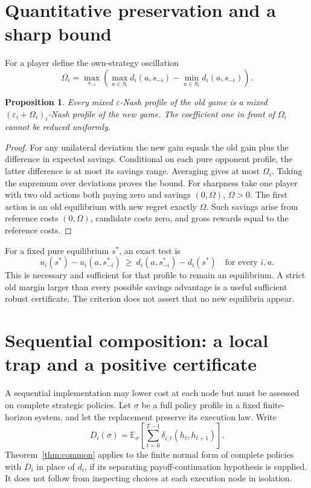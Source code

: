 \documentclass[11pt]{article}
\newtheorem{proposition}[theorem]{Proposition}
\begin{document}
\section{Quantitative preservation and a sharp bound}
For a player define the own-strategy oscillation
\[
 \Omega_i=\max_{s_{-i}}\left(\max_{a\in S_i}d_i(a,s_{-i})-
                                      \min_{a\in S_i}d_i(a,s_{-i})\right).
\]
\begin{proposition}\label{prop:regret}
Every mixed \(\varepsilon\)-Nash profile of the old game is a mixed
\((\varepsilon_i+\Omega_i)_i\)-Nash profile of the new game. The coefficient one in front of \(\Omega_i\) cannot be reduced uniformly.
\end{proposition}
\begin{proof}
For any unilateral deviation the new gain equals the old gain plus the difference in expected savings. Conditional on each pure opponent profile, the latter difference is at most its savings range. Averaging gives at most \(\Omega_i\). Taking the supremum over deviations proves the bound. For sharpness take one player with two old actions both paying zero and savings \((0,\Omega)\), \(\Omega>0\). The first action is an old equilibrium with new regret exactly \(\Omega\). Such savings arise from reference costs \((0,\Omega)\), candidate costs zero, and gross rewards equal to the reference costs.
\end{proof}
For a fixed pure equilibrium \(s^*\), an exact test is
\[
 u_i(s^*)-u_i(a,s^*_{-i})\ \geq\
 d_i(a,s^*_{-i})-d_i(s^*)\quad\text{for every }i,a.
\]
This is necessary and sufficient for that profile to remain an equilibrium. A strict old margin larger than every possible savings advantage is a useful sufficient robust certificate. The criterion does not assert that no new equilibria appear.

\section{Sequential composition: a local trap and a positive certificate}
A sequential implementation may lower cost at each node but must be assessed on complete strategic policies. Let \(\sigma\) be a full policy profile in a fixed finite-horizon system, and let the replacement preserve its execution law. Write
\[
 D_i(\sigma)=\mathbb E_\sigma\left[\sum_{t=0}^{T-1}\delta_{i,t}(h_t,h_{t+1})\right].
\]
Theorem~\ref{thm:common} applies to the finite normal form of complete policies with \(D_i\) in place of \(d_i\), if its separating payoff-continuation hypothesis is supplied. It does not follow from inspecting choices at each execution node in isolation.
\end{document}
